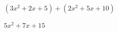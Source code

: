 
\question $(3x^2 + 2x + 5) + (2x^2 + 5x + 10)$

  \begin{solutionorlines}[2cm]
    $5x^2 + 7x + 15$
  \end{solutionorlines}
